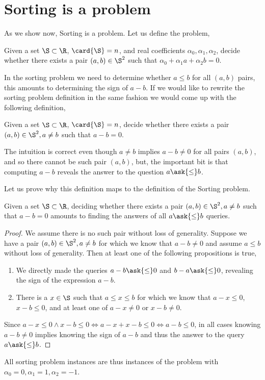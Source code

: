 \section{Sorting is a \twoLDT problem}

As we show now, Sorting is a \twoLDT problem. Let us define the
\twoLDT problem,

\begin{problem}[\twoLDT]
Given a set $\S \subset \R$, $\card{\S} = n$, and real coefficients $\alpha_0,
\alpha_1, \alpha_2$, decide whether there exists a pair $(a,b) \in \S^2$ such that
$\alpha_0 + \alpha_1 a + \alpha_2 b = 0$.
\end{problem}

In the sorting problem we need to determine whether $a \le b$ for all $(a,b)$
pairs, this amounts to determining the sign of $a-b$. If we would like to rewrite
the sorting problem definition in the same fashion we would come up with the
following definition,

\begin{problem}
Given a set $\S \subset \R$, $\card{\S} = n$, decide whether there exists a
pair $(a,b) \in \S^2, a \neq b$ such that $a - b = 0$.
\end{problem}

The intuition is correct even though $a \neq b$ implies $a-b \neq 0$ for all
pairs \((a,b)\), and so there cannot be such pair \((a,b)\), but, the important
bit is that computing $a-b$ reveals the answer to the question $a \ask{\le} b$.

Let us prove why this definition maps to the definition of the Sorting problem.

\begin{theorem}
Given a set \(\S \subset \R\), deciding whether there exists a pair \((a,b)
\in \S^2, a \neq b\) such that \(a - b = 0\) amounts to finding the answers of all \(a
\ask{\le} b\) queries.
\end{theorem}

\begin{proof}
We assume there is no such pair without loss of generality.
Suppose we have a pair \((a,b) \in \S^2, a \neq b\) for which we
know that \(a - b \neq 0\) and assume \(a \le b\) without loss of generality.
Then at least one of the following propositions is true,
\begin{enumerate}
\item We directly made the queries \(a - b
\ask{\le} 0\) and \(b - a \ask{\le} 0\), revealing the sign of the expression
\(a - b\).
\item There is a \(x \in \S\) such that \(a \le x \le b\) for which we
know that \(a - x \le 0\), \(x - b \le 0\), and at least one of \(a - x \neq
0\) or \(x - b \neq 0\).
\end{enumerate}
Since \(a - x \le 0 \land x - b \le 0 \iff a - x + x - b \le 0 \iff a - b \le
0\), in all cases knowing \(a - b \neq 0\) implies knowing the sign of \(a -
b\) and thus the answer to the query \(a \ask{\le} b\).
\end{proof}

All sorting problem instances are thus instances of the \twoLDT problem with
$\alpha_0 = 0, \alpha_1 = 1, \alpha_2 = -1$.
